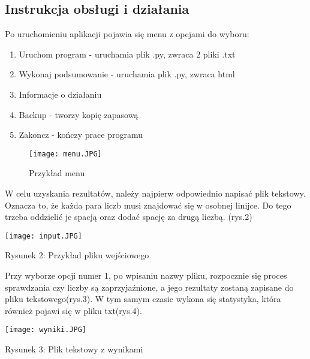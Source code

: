 \documentclass[12pt,a4paper]{article}
\begin{document}
\newpage
	\subsection{Instrukcja obsługi i działania}
	\hspace{20} Po uruchomieniu aplikacji pojawia się menu z opcjami do wyboru:
	\begin{enumerate}
	   
	    \item Uruchom program  - uruchamia plik .py, zwraca 2 pliki .txt
	    \item Wykonaj podsumowanie  - uruchamia plik .py, zwraca html
	    \item Informacje o działaniu 
	    \item Backup  - tworzy kopię zapasową
	    \item Zakoncz - kończy prace programu
	    
	\end{enumerate}
	
	\begin{figure}[h]
	    \begin{center}
	    \texttt{[image: menu.JPG]}
	    \caption{Przykład menu}
	    \end{center}
	    \end{figure}
	
	
	\hspace{10} W celu uzyskania rezultatów, należy najpierw odpowiednio napisać plik tekstowy. Oznacza to, że każda para liczb musi znajdować się w osobnej linijce. Do tego trzeba oddzielić je spacją oraz dodać spację za drugą liczbą. (rys.2) \newline
	
	\begin{center}
	    \texttt{[image: input.JPG]}
	    \begin{caption}
	    \caption{Rysunek 2: Przykład pliku wejściowego}
	    \end{caption}
	    \end{center}
    	
    	
	
	\hspace{10} Przy wyborze opcji numer 1, po wpisaniu nazwy pliku, rozpocznie się proces sprawdzania czy liczby są zaprzyjaźnione, a jego rezultaty zostaną zapisane do pliku tekstowego(rys.3). W tym samym czasie wykona się statystyka, która również pojawi się w pliku txt(rys.4).
	
	    \begin{center}
	    \texttt{[image: wyniki.JPG]}
	    \begin{caption}
	    \caption{Rysunek 3: Plik tekstowy z wynikami}
	    \end{caption}
	    \end{center}
	    
\end{document}
